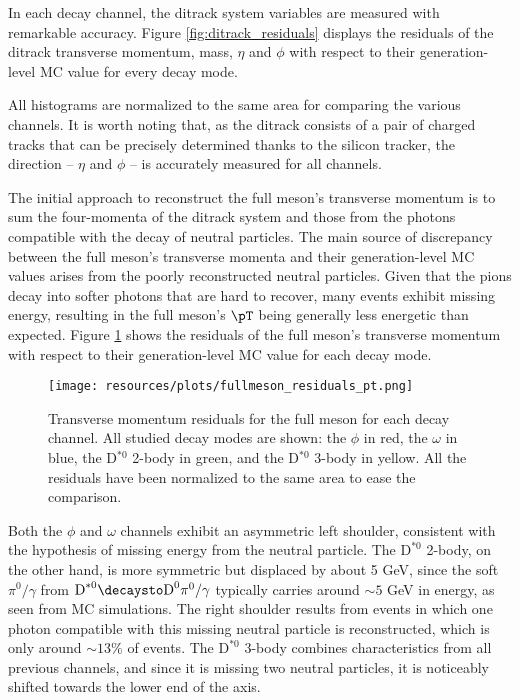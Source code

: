 In each decay channel, the ditrack system variables are measured with remarkable accuracy. Figure \ref{fig:ditrack_residuals} displays the residuals of the ditrack transverse momentum, mass, $\eta$ and $\phi$ with respect to their generation-level MC value for every decay mode.

All histograms are normalized to the same area for comparing the various channels. It is worth noting that, as the ditrack consists of a pair of charged tracks that can be precisely determined thanks to the silicon tracker, the direction -- $\eta$ and $\phi$ -- is accurately measured for all channels.

The initial approach to reconstruct the full meson's transverse momentum is to sum the four-momenta of the ditrack system and those from the photons compatible with the decay of neutral particles. The main source of discrepancy between the full meson's transverse momenta and their generation-level MC values arises from the poorly reconstructed neutral particles. Given that the pions decay into softer photons that are hard to recover, many events exhibit missing energy, resulting in the full meson's $\pT$ being generally less energetic than expected. Figure \ref{fig:fullmeson_residuals_pt} shows the residuals of the full meson's transverse momentum with respect to their generation-level MC value for each decay mode.
\begin{figure}[!ht]
    \captionsetup[subfigure]{labelformat=empty}
    \vspace*{-0.2cm}
    \centering
    \setlength{\mylength}{\textwidth}
    \texttt{[image: resources/plots/fullmeson\_residuals\_pt.png]}
    \caption{Transverse momentum residuals for the full meson for each decay channel. All studied decay modes are shown: the $\phi$ in red, the $\omega$ in blue, the D$^{*0}$ 2-body in green, and the D$^{*0}$ 3-body in yellow. All the residuals have been normalized to the same area to ease the comparison.}
    \label{fig:fullmeson_residuals_pt}
    \vspace*{-0.0cm}
\end{figure}
Both the $\phi$ and $\omega$ channels exhibit an asymmetric left shoulder, consistent with the hypothesis of missing energy from the neutral particle. The $\text{D}^{*0}$ 2-body, on the other hand, is more symmetric but displaced by about 5 GeV, since the soft $\pi^{0}/\gamma$ from $\text{D}^{*0}\decaysto \text{D}^{0}\pi^{0}/\gamma$ typically carries around $\sim5$ GeV in energy, as seen from MC simulations. The right shoulder results from events in which one photon compatible with this missing neutral particle is reconstructed, which is only around $\sim 13\%$ of events. The $\text{D}^{*0}$ 3-body combines characteristics from all previous channels, and since it is missing two neutral particles, it is noticeably shifted towards the lower end of the axis.

